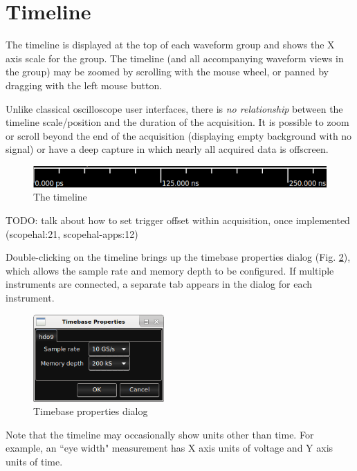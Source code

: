 
\section{Timeline}

The timeline is displayed at the top of each waveform group and shows the X axis scale for the group. The timeline (and
all accompanying waveform views in the group) may be zoomed by scrolling with the mouse wheel, or panned by dragging
with the left mouse button.

Unlike classical oscilloscope user interfaces, there is \emph{no relationship} between the timeline scale/position and
the duration of the acquisition. It is possible to zoom or scroll beyond the end of the acquisition (displaying empty
background with no signal) or have a deep capture in which nearly all acquired data is offscreen.

\begin{figure}[h]
\centering
\includegraphics[width=13cm]{images/timeline.png}
\caption{The timeline}
\label{timeline}
\end{figure}

TODO: talk about how to set trigger offset within acquisition, once implemented (scopehal:21, scopehal-apps:12)

Double-clicking on the timeline brings up the timebase properties dialog (Fig. \ref{timebase-properties}), which allows
the sample rate and memory depth to be configured. If multiple instruments are connected, a separate tab appears in the
dialog for each instrument.

\begin{figure}[h]
\centering
\includegraphics[width=5cm]{images/timebase-properties.png}
\caption{Timebase properties dialog}
\label{timebase-properties}
\end{figure}


Note that the timeline may occasionally show units other than time. For example, an ``eye width" measurement has X axis
units of voltage and Y axis units of time.
